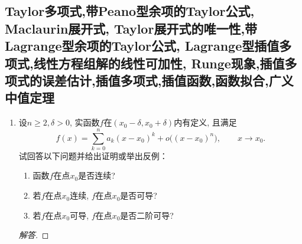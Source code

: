\subsection{Taylor多项式,带Peano型余项的Taylor公式, Maclaurin展开式, Taylor展开式的唯一性,带Lagrange型余项的Taylor公式, Lagrange型插值多项式,线性方程组解的线性可加性, Runge现象,插值多项式的误差估计,插值多项式,插值函数,函数拟合,广义中值定理}
\begin{5a}
\begin{enumerate}
\item 设\(n\geqslant 2, \delta>0\), 实函数\(f\)在\((x_0-\delta,x_0+\delta)\)内有定义, 且满足
\[f(x)=\sum_{k=0}^{n}a_k(x-x_0)^k+o\big((x-x_0)^n\big),\qquad x\rightarrow x_0.\]
试回答以下问题并给出证明或举出反例：
\begin{enumerate}[label=(\arabic*)]
\item 函数\(f\)在点\(x_0\)是否连续?
\item  若\(f\)在点\(x_0\)连续, \(f\)在点\(x_0\)是否可导?
\item  若\(f\)在点\(x_0\)可导, \(f\)在点\(x_0\)是否二阶可导?
\end{enumerate}
\begin{proof}[解答]


\end{proof}
\end{enumerate}
\end{5a}
